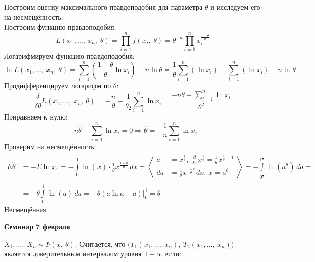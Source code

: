 \documentclass[12pt, a4paper]{article}
\begin{document}
Построим оценку максимального правдоподобия для параметра $\theta$ и исследуем его на несмещённость.\\
Построим функцию правдоподобия:
\begin{equation*}
    L(x_1,\dots,\ x_n,\ \theta) = \prod_{i = 1}^{n} f(x_i,\ \theta) = \theta^{-n} \prod_{i = 1}^{n} x_i^{\frac{1 - \theta}{\theta}}
\end{equation*}
Логарифмируем функцию правдоподобия:
\begin{equation*}
    \ln L(x_1,\dots,\ x_n,\ \theta) = \sum_{i = 1}^{n} \left(\frac{1 - \theta}{\theta} \ln x_i\right) -n\ln \theta = \frac{1}{\theta} \sum_{i = 1}^{n} (\ln x_i) - \sum_{i = 1}^{n} (\ln x_i) - n \ln \theta
\end{equation*}
Продифференцируем логарифм по $\theta$:
\begin{equation*}
    \frac{\delta}{\delta \theta} L(x_1,\dots,\ x_n,\ \theta) = - \frac{n}{\theta} - \frac{1}{\theta_2} \sum_{i = 1}^{n} \ln x_i = \dfrac{-n\theta - \sum\limits_{i = 1}^{n} \ln x_i}{\theta^2}
\end{equation*}
Приравняем к нулю:
\begin{equation*}
    -n\hat\theta - \sum_{i = 1}^{n} \ln x_i = 0\Rightarrow \hat\theta = - \frac{1}{n} \sum_{i = 1}^{n} \ln x_i
\end{equation*}
Проверим на несмещённость:
\begin{equation*}
    \begin{aligned}
        E\hat\theta &= -E\ln x_1 = -\int\limits_0^1\ln (x) \cdot \frac{1}{\theta}x^{\frac{1 - \theta}{\theta}}\, dx = \left<\begin{aligned}
            a &= x^{\frac{1}{\theta}},\ \frac{d}{dx} x^{\frac{1}{\theta}} = \frac{1}{\theta} x^{\frac{1}{\theta} - 1}\\
            da &= \frac{1}{\theta}x^{\frac{1 - \theta}{\theta}}dx,\ x = a^{\theta}\\
        \end{aligned}  \right> = -\int\limits_{0^{\frac{1}{\theta}}}^{1^{\frac{1}{\theta}}} \ln(a^{\theta})\, da =\\
        &= -\theta \int\limits_0^1 \ln (a)\, da = -\theta \left( a\ln a - a \right)\Big|_0^1 = \theta
    \end{aligned}
\end{equation*}
Несмещённая.
\begin{center}
    \bf Семинар 7 февраля
\end{center}
$X_1,\dots,\ X_n \sim F(x,\ \theta)$. Считается, что $\big( T_1(x_1,\dots,\ x_n),\ T_2(x_1,\dots,\ x_n) \big)$ является доверительным интервалом уровня $1 - \alpha$, если:
\end{document}
